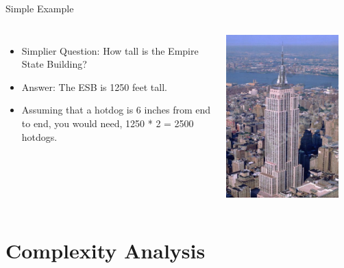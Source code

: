 \documentclass{beamer}
\begin{document}
\begin{frame}{Simple Example}
\begin{columns}
\begin{itemize}
\item Simplier Question: How tall is the Empire State Building?
\item Answer: The ESB is 1250 feet tall.
\item Assuming that a hotdog is 6 inches from end to end, you would need, 1250 * 2 = 2500 hotdogs.
\end{itemize}
\includegraphics[width=0.9\textwidth]{../imgs/empire-state.png}
\end{columns}
\end{frame}

\section{Complexity Analysis}
\end{document}
